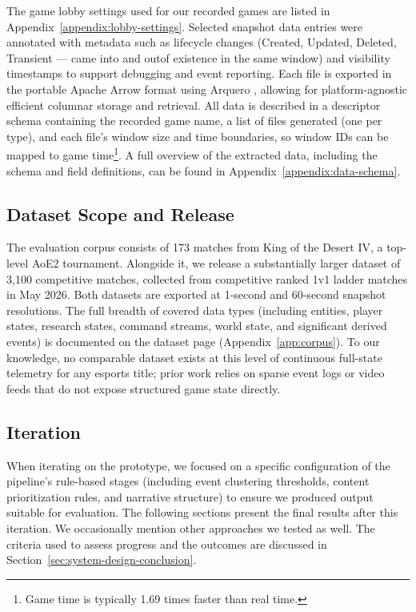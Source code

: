 The game lobby settings used for our recorded games are listed in Appendix~\ref{appendix:lobby-settings}. Selected snapshot data entries were annotated with metadata such as lifecycle changes (Created, Updated, Deleted, Transient --- came into and outof existence in the same window) and visibility timestamps to support debugging and event reporting. Each file is exported in the portable Apache Arrow format using Arquero \cite{arquero}, allowing for platform-agnostic efficient columnar storage and retrieval. All data is described in a descriptor schema containing the recorded game name, a list of files generated (one per type), and each file's window size and time boundaries, so window IDs can be mapped to game time\footnote{Game time is typically 1.69 times faster than real time.}. A full overview of the extracted data, including the schema and field definitions, can be found in Appendix~\ref{appendix:data-schema}.

\subsection{Dataset Scope and Release}
The evaluation corpus consists of 173 matches from King of the Desert IV, a top-level AoE2 tournament. Alongside it, we release a substantially larger dataset of 3,100 competitive matches, collected from competitive ranked 1v1 ladder matches in May 2026. Both datasets are exported at 1-second and 60-second snapshot resolutions. The full breadth of covered data types (including entities, player states, research states, command streams, world state, and significant derived events) is documented on the dataset page (Appendix~\ref{app:corpus}). To our knowledge, no comparable dataset exists at this level of continuous full-state telemetry for any esports title; prior work relies on sparse event logs or video feeds that do not expose structured game state directly.

\subsection{Iteration}
When iterating on the prototype, we focused on a specific configuration of the pipeline's rule-based stages (including event clustering thresholds, content prioritization rules, and narrative structure) to ensure we produced output suitable for evaluation. The following sections present the final results after this iteration. We occasionally mention other approaches we tested as well. The criteria used to assess progress and the outcomes are discussed in Section~\ref{sec:system-design-conclusion}.

